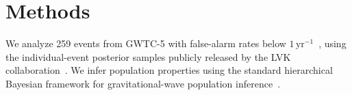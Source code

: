 \documentclass[twocolumn,twocolappendix,linenumbers]{aastex631}
\newcommand{\sa}[1]{{\bf\color{Thistle}SA: #1}}
\begin{document}
 
\section{Methods}\label{sec:methods}

We analyze 259 events from \acs{GWTC-5} with false-alarm rates below $1\,\mathrm{yr}^{-1}$~\citep{LIGOScientific:2026wfs}, using the individual-event posterior samples publicly released by the \acs{LVK} collaboration~\citep{ligo_scientific_collaboration_and_virgo_2026_20348005,ligo_scientific_collaboration_and_virgo_2026_20348006}.
We infer population properties using the standard hierarchical Bayesian framework for gravitational-wave population inference~\citep{Mandel:2018mve,Thrane:2018qnx,Vitale:2020aaz,Essick:2023upv}.
\end{document}
